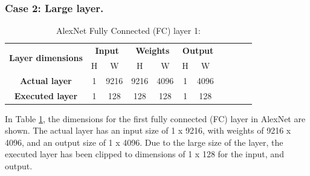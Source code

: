 \subsubsection{Case 2: Large layer.}

\begin{table}[H]
\centering
\caption{AlexNet Fully Connected (FC) layer 1:}
\label{tab:permFcCase2Dim}
 \begin{tabular}{|c|c|c|c|c|c|c|c|c|c|c|} \hline  
 
 \multirow{2}{*}{\textbf{Layer dimensions}} &  
 \multicolumn{2}{|c|}{\textbf{Input}} &  
 \multicolumn{2}{|c|}{\textbf{Weights}} &  
 \multicolumn{2}{|c|}{\textbf{Output}}\\ \cline{2-7}
 & H &  W &  H &  W & H &  W\\ \hline  
 \textbf{Actual layer} &  1 &  9216 & 9216 & 4096 & 1 & 4096 \\ \hline 
 \textbf{Executed layer} &  1 &  \cellcolor{yellow}128 & \cellcolor{yellow}128 & \cellcolor{yellow}128 & 1 & \cellcolor{yellow}128 \\ \hline 
 \end{tabular}
\end{table}

In Table \ref{tab:permFcCase2Dim}, the dimensions for the first fully connected (FC) layer in AlexNet are shown. The actual layer has an input size of 1 x 9216, with weights of 9216 x 4096, and an output size of 1 x 4096. Due to the large size of the layer, the executed layer has been clipped to dimensions of 1 x 128 for the input, and output.

\begin{table}[H]
\centering
\caption{Loop permutation sweep}
\label{tab:permFcCase2Sweep}
\end{table}

